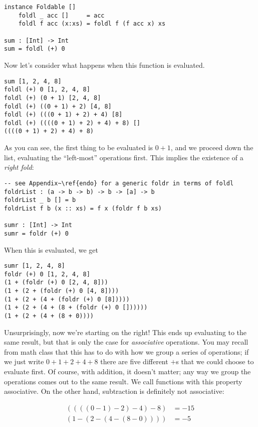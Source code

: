 \documentclass{book}
\begin{document}
\begin{lstlisting}[language=pseudoml]
instance Foldable []
    foldl _ acc []     = acc
    foldl f acc (x:xs) = foldl f (f acc x) xs

sum : [Int] -> Int
sum = foldl (+) 0
\end{lstlisting}

Now let's consider what happens when this function is evaluated.

\begin{verbatim}
sum [1, 2, 4, 8]
foldl (+) 0 [1, 2, 4, 8]
foldl (+) (0 + 1) [2, 4, 8]
foldl (+) ((0 + 1) + 2) [4, 8]
foldl (+) (((0 + 1) + 2) + 4) [8]
foldl (+) ((((0 + 1) + 2) + 4) + 8) []
((((0 + 1) + 2) + 4) + 8)
\end{verbatim}

As you can see, the first thing to be evaluated is \( 0 + 1 \), and we proceed down the list, evaluating the ``left-most'' operations first. This implies the existence of a \emph{right fold}:

\begin{lstlisting}[language=pseudoml,texcl]
-- see Appendix~\ref{endo} for a generic foldr in terms of foldl
foldrList : (a -> b -> b) -> b -> [a] -> b
foldrList _ b [] = b
foldrList f b (x :: xs) = f x (foldr f b xs)

sumr : [Int] -> Int
sumr = foldr (+) 0
\end{lstlisting}

When this is evaluated, we get

\begin{verbatim}
sumr [1, 2, 4, 8]
foldr (+) 0 [1, 2, 4, 8]
(1 + (foldr (+) 0 [2, 4, 8]))
(1 + (2 + (foldr (+) 0 [4, 8])))
(1 + (2 + (4 + (foldr (+) 0 [8]))))
(1 + (2 + (4 + (8 + (foldr (+) 0 [])))))
(1 + (2 + (4 + (8 + 0))))
\end{verbatim}

Unsurprisingly, now we're starting on the right! This ends up evaluating to the same result, but that is only the case for \emph{associative} operations. You may recall from math class that this has to do with how we group a series of operations; if we just write \( 0 + 1 + 2 + 4 + 8 \) there are five different \( + \)s that we could choose to evaluate first. Of course, with addition, it doesn't matter; any way we group the operations comes out to the same result. We call functions with this property associative. On the other hand, subtraction is definitely not associative:

\begin{align*}
((((0 - 1) - 2) - 4) - 8) &= -15 \\
(1 - (2 - (4 - (8 - 0)))) &= -5
\end{align*}
\end{document}
